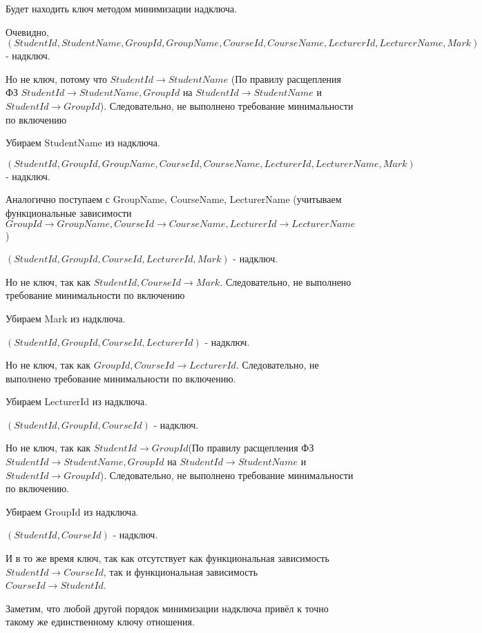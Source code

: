 \documentclass{article}
\begin{document}
	Будет находить ключ методом минимизации надключа.
	
	Очевидно, $(StudentId, StudentName, GroupId, GroupName, CourseId, CourseName, LecturerId, LecturerName, Mark)$ - надключ.
	
	Но не ключ, потому что $StudentId \rightarrow StudentName$ (По правилу расщепления ФЗ $StudentId \rightarrow StudentName, GroupId$ на $StudentId \rightarrow StudentName$ и $StudentId \rightarrow GroupId$). Следовательно, не выполнено требование минимальности по включению
	
	Убираем StudentName из надключа. 
	
	$(StudentId, GroupId, GroupName, CourseId, CourseName, LecturerId, LecturerName, Mark)$ - надключ.
	
	Аналогично поступаем с GroupName, CourseName, LecturerName (учитываем функциональные зависимости $GroupId \rightarrow GroupName, CourseId \rightarrow CourseName, LecturerId \rightarrow LecturerName$ )
	
	$(StudentId, GroupId, CourseId, LecturerId, Mark)$ - надключ.
	
	Но не ключ, так как $StudentId, CourseId \rightarrow Mark$. Следовательно, не выполнено требование минимальности по включению
	
	Убираем Mark из надключа. 
	
	$(StudentId, GroupId, CourseId, LecturerId)$ - надключ.
	
	Но не ключ, так как $GroupId, CourseId \rightarrow LecturerId$. Следовательно, не выполнено требование минимальности по включению.
	
	Убираем LecturerId из надключа. 
	
	$(StudentId, GroupId, CourseId)$ - надключ.
	
	Но не ключ, так как $StudentId \rightarrow GroupId$(По правилу расщепления ФЗ $StudentId \rightarrow StudentName, GroupId$ на $StudentId \rightarrow StudentName$ и $StudentId \rightarrow GroupId$). Следовательно, не выполнено требование минимальности по включению.
	
	Убираем GroupId из надключа. 
	
	$(StudentId, CourseId)$ - надключ.
	
	И в то же время ключ, так как отсутствует как функциональная зависимость $StudentId \rightarrow CourseId$, так и функциональная зависимость $CourseId \rightarrow StudentId$.
	
	Заметим, что любой другой порядок минимизации надключа привёл к точно такому же единственному ключу отношения.
	
\end{document}
